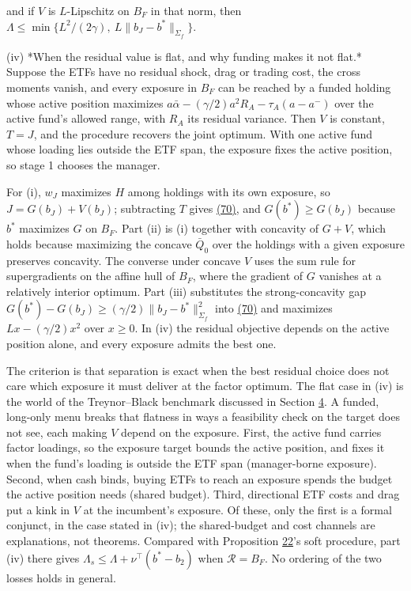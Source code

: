 \documentclass[11pt]{article}
\begin{document}
and if \(V\) is \(L\)-Lipschitz on \(B_F\) in that norm, then
\(\Lambda\leq\min\{L^2/(2\gamma),\ L\|b_J-b^*\|_{\Sigma_f}\}\).

(iv) *When the residual value is flat, and why funding makes it
not flat.* Suppose the ETFs have no residual shock, drag or trading
cost, the cross moments vanish, and every exposure in \(B_F\) can be
reached by a funded holding whose active position maximizes
\(a\bar\alpha-(\gamma/2)a^2R_A-\tau_A(a-a^-)\) over the active
fund's allowed range, with \(R_A\) its residual variance. Then \(V\)
is constant, \(T=J\), and the procedure recovers the joint optimum.
With one active fund whose loading lies outside the ETF span, the
exposure fixes the active position, so stage 1 chooses the manager.

For (i), \(w_J\) maximizes \(H\) among holdings with its own
exposure, so \(J=G(b_J)+V(b_J)\); subtracting \(T\) gives \hyperref[eq:70]{(70)}, and
\(G(b^*)\geq G(b_J)\) because \(b^*\) maximizes \(G\) on \(B_F\).
Part (ii) is (i) together with concavity of \(G+V\), which holds
because maximizing the concave \(\bar Q_0\) over the holdings with a
given exposure preserves concavity. The converse under concave
\(V\) uses the sum rule for supergradients on the affine hull of
\(B_F\), where the gradient of \(G\) vanishes at a relatively
interior optimum. Part (iii) substitutes the strong-concavity gap
\(G(b^*)-G(b_J)\geq(\gamma/2)\|b_J-b^*\|^2_{\Sigma_f}\) into \hyperref[eq:70]{(70)}
and maximizes \(Lx-(\gamma/2)x^2\) over \(x\geq0\). In (iv) the
residual objective depends on the active position alone, and every
exposure admits the best one.

The criterion is that separation is exact when the best residual
choice does not care which exposure it must deliver at the factor
optimum. The flat case in (iv) is the world of the Treynor--Black
benchmark discussed in Section \hyperref[sec:4]{4}. A funded, long-only menu breaks
that flatness in ways a feasibility check on the target does not
see, each making \(V\) depend on the exposure. First, the active
fund carries factor loadings, so the exposure target bounds the
active position, and fixes it when the fund's loading is outside
the ETF span (manager-borne exposure). Second, when cash binds,
buying ETFs to reach an exposure spends the budget the active
position needs (shared budget). Third, directional ETF costs and
drag put a kink in \(V\) at the incumbent's exposure. Of these,
only the first is a formal conjunct, in the case stated in (iv);
the shared-budget and cost channels are explanations, not
theorems. Compared with Proposition \hyperref[res:Proposition-22]{22}'s soft procedure, part (iv)
there gives \(\Lambda_s\leq\Lambda+\nu^\top(b^*-b_2)\) when
\(\mathcal R=B_F\). No ordering of the two losses holds in general.
\end{document}
